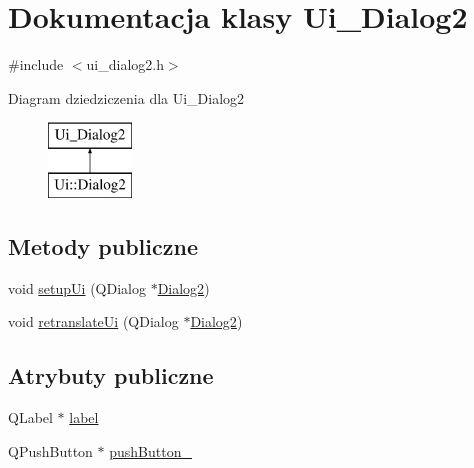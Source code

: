 \hypertarget{classUi__Dialog2}{\section{Dokumentacja klasy Ui\-\_\-\-Dialog2}
\label{classUi__Dialog2}
}


{\ttfamily \#include $<$ui\-\_\-dialog2.\-h$>$}

Diagram dziedziczenia dla Ui\-\_\-\-Dialog2\begin{figure}[H]
\begin{center}
\leavevmode
\includegraphics[height=2.000000cm]{d6/d6d/classUi__Dialog2}
\end{center}
\end{figure}
\subsection*{Metody publiczne}
\begin{DoxyCompactItemize}
\item 
void \hyperlink{classUi__Dialog2_a6844bf81dbbb01d6eb47136862dccaa8}{setup\-Ui} (Q\-Dialog $\ast$\hyperlink{classDialog2}{Dialog2})
\item 
void \hyperlink{classUi__Dialog2_a26d6371581ce3b88c8814129a6bdc607}{retranslate\-Ui} (Q\-Dialog $\ast$\hyperlink{classDialog2}{Dialog2})
\end{DoxyCompactItemize}
\subsection*{Atrybuty publiczne}
\begin{DoxyCompactItemize}
\item 
Q\-Label $\ast$ \hyperlink{classUi__Dialog2_a8dbc9bc2d13fc587b1013a6fea211419}{label}
\item 
Q\-Push\-Button $\ast$ \hyperlink{classUi__Dialog2_a02fa58cd4b3b9c0e32a192c4178899e1}{push\-Button\-\_}
\end{DoxyCompactItemize}


